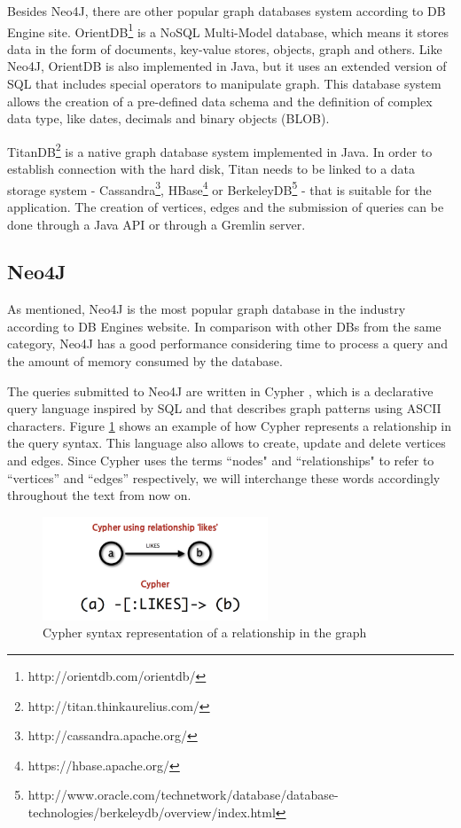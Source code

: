 Besides Neo4J, there are other popular graph databases system according to DB Engine site. OrientDB\footnote{http://orientdb.com/orientdb/} is a NoSQL Multi-Model database, which means it stores data in the form of documents, key-value stores, objects, graph and others. Like Neo4J, OrientDB is also implemented in Java, but it uses an extended version of SQL that includes special operators to manipulate graph. This database system allows the creation of a pre-defined data schema and the definition of complex data type, like dates, decimals and binary objects (BLOB).
 
TitanDB\footnote{http://titan.thinkaurelius.com/} is a native graph database system implemented in Java. In order to establish connection with the hard disk, Titan needs to be linked to a data storage system - Cassandra\footnote{http://cassandra.apache.org/}, HBase\footnote{https://hbase.apache.org/} or BerkeleyDB\footnote{http://www.oracle.com/technetwork/database/database-technologies/berkeleydb/overview/index.html} - that is suitable for the application. The creation of vertices, edges and the submission of queries can be done through a Java API or through a Gremlin server.

\subsection{Neo4J}

As mentioned, Neo4J is the most popular graph database in the industry according to DB Engines website. In comparison with other DBs from the same category, Neo4J has a good performance considering time to process a query and the amount of memory consumed by the database.

The queries submitted to Neo4J are written in Cypher \cite{Neo4jCypher}, which is a declarative query language inspired by SQL and that describes graph patterns using ASCII characters. Figure \ref{fig:figure29} shows an example of how Cypher represents a relationship in the query syntax. This language also allows to create, update and delete vertices and edges. Since Cypher uses the terms ``nodes" and ``relationships" to refer to ``vertices'' and ``edges'' respectively, we will interchange these words accordingly throughout the text from now on.

\begin{figure}[ht]
\centering
\includegraphics[width=0.6\textwidth]{../cypher_pattern_simple.png}
\caption{Cypher syntax representation of a relationship in the graph \cite{Neo4jCypher}}
\label{fig:figure29}
\end{figure}

